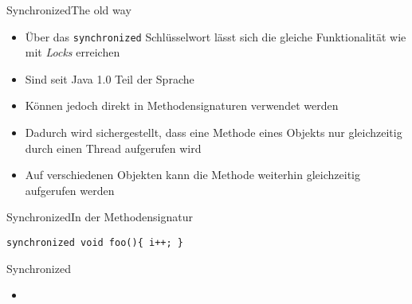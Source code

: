 \begin{frame}{Synchronized}{The old way}
    \begin{itemize}
        \item Über das \texttt{synchronized} Schlüsselwort lässt sich die gleiche Funktionalität wie mit \textit{Locks} erreichen
        \item Sind seit Java 1.0 Teil der Sprache
        \item Können jedoch direkt in Methodensignaturen verwendet werden
        \item Dadurch wird sichergestellt, dass eine Methode eines Objekts nur gleichzeitig durch einen Thread aufgerufen wird
        \item Auf verschiedenen Objekten kann die Methode weiterhin gleichzeitig aufgerufen werden
    \end{itemize}
\end{frame}

\begin{frame}{Synchronized}{In der Methodensignatur}
\lstset{style=java}
\begin{lstlisting}
synchronized void foo(){ i++; }
\end{lstlisting}
\end{frame}

\begin{frame}{Synchronized}{}
    \begin{itemize}
        \item 
    \end{itemize}
\end{frame}